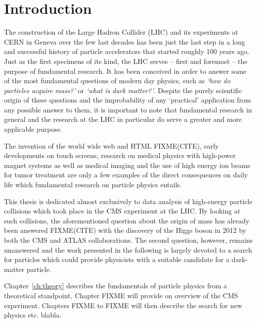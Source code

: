 \newcommand{\package}{\emph}

\chapter{Introduction}

The construction of the Large Hadron Collider (LHC) and its experiments at CERN in Geneva over the few last decades has been just
the last step in a long and successful history of particle accelerators that started 
roughly 100 years ago. Just as the first specimens of its kind, the LHC serves -- first 
and foremost -- the purpose of fundamental research. It has been conceived in order to answer
some of the most fundamental questions of modern day physics, such as \textit{`how do particles
acquire mass?'} or \textit{`what is dark matter?'}.
Despite the purely scientific origin of these questions and the improbability of any `practical'
application from any possible answer to them, it is important to note that fundamental
research in general and the research at the LHC in particular do serve a greater and more applicable purpose.

The invention of the world wide web and HTML FIXME(CITE), early developments on touch screens,
research on medical physics with high-power magnet systems as well as medical imaging and the use
of high energy ion beams for tumor treatment are only a few examples of the direct consequences on
daily life which fundamental research on particle physics entails. 

This thesis is dedicated almost exclusively to data analysis of high-energy particle collisions
which took place in the CMS experiment at the LHC. By looking at such collisions, the aforementioned
question about the origin of mass has already been answered FIXME(CITE) with the discovery of the Higgs
boson in 2012 by both the CMS and ATLAS collaborations. The second question, however, remains unanswered
and the work presented in the following is largely devoted to a search for particles which could provide
physicists with a suitable candidate for a dark-matter particle. 

Chapter~\ref{ch:theory} describes the fundamentals of particle physics from a theoretical standpoint,
Chapter FIXME will provide on overview of the CMS experiment. Chapters FIXME to FIXME will then describe
the search for new physics etc. blabla.






